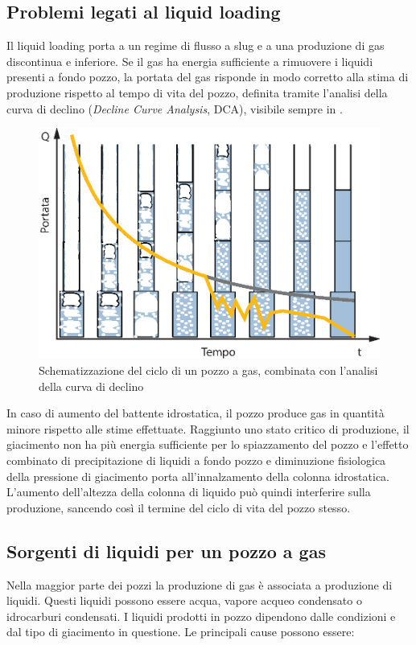 \subsection{Problemi legati al liquid loading}
Il liquid loading porta a un regime di flusso a slug e a una produzione di gas discontinua e inferiore. Se il gas ha energia sufficiente a rimuovere i liquidi presenti a fondo pozzo, la portata del gas risponde in modo corretto alla stima di produzione rispetto al tempo di vita del pozzo, definita tramite l'analisi della curva di declino (\textit{Decline Curve Analysis}, DCA), visibile sempre in .

\begin{figure}[htbp]
    \centering
    \includegraphics[width=.8\textwidth]{fig/foamer/declinecurve.eps}
    \caption{Schematizzazione del ciclo di un pozzo a gas, combinata con l'analisi della curva di declino \parencite{lea2011gas}}
    \label{fig:declinecurve}
\end{figure}

In caso di aumento del battente idrostatica, il pozzo produce gas in quantità minore rispetto alle stime effettuate. Raggiunto uno stato critico di produzione, il giacimento non ha più energia sufficiente per lo spiazzamento del pozzo e l'effetto combinato di precipitazione di liquidi a fondo pozzo e diminuzione fisiologica della pressione di giacimento porta all'innalzamento della colonna idrostatica. L'aumento dell'altezza della colonna di liquido può quindi interferire sulla produzione, sancendo così il termine del ciclo di vita del pozzo stesso.
 
\subsection{Sorgenti di liquidi per un pozzo a gas}
Nella maggior parte dei pozzi la produzione di gas è associata a produzione di liquidi. Questi liquidi possono essere acqua, vapore acqueo condensato o idrocarburi condensati. I liquidi prodotti in pozzo dipendono dalle condizioni e dal tipo di giacimento in questione. Le principali cause possono essere:

